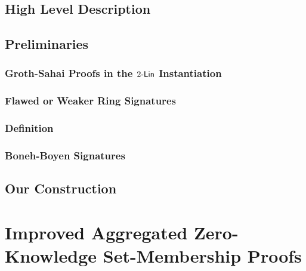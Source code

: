     
    
    \section{High Level Description}
        

    \section{Preliminaries}
        
        \subsection{Groth-Sahai Proofs in the $2\mbox{-}\mathsf{Lin}$ Instantiation}
        
            

        \subsection{Flawed or Weaker Ring Signatures}\label{sec:rs-flawed}
    
            

        \subsection{Definition}
    
            

        \subsection{Boneh-Boyen Signatures} \label{sec:bbs}
    
            

    \section{Our Construction}
    
        


\chapter{Improved Aggregated Zero-Knowledge Set-Membership Proofs} \label{improved-aZKSMP} \label{sec:improved-aZKSMP}

